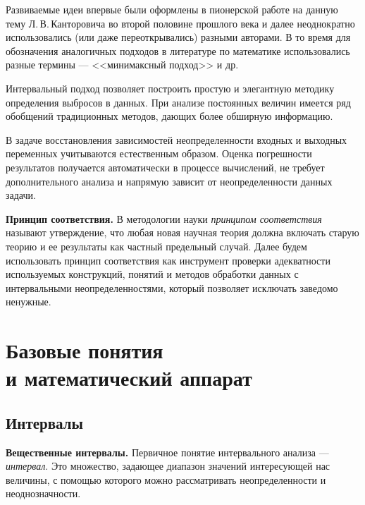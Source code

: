 \documentclass[a5paper,openany]{book}
\begin{document}
{{Развиваемые идеи впервые были оформлены в пионерской работе на данную тему
Л.\,В.\,Канторовича \cite{Kantorovich} во второй половине прошлого века и далее неоднократно использовались (или даже переоткрывались) разными авторами. 
В то время для обозначения  
аналогичных  подходов в литературе по математике использовались разные термины --- <<минимаксный подход>> и др. 

Интервальный подход позволяет построить простую и 
элегантную методику определения выбросов в данных. 
При анализе постоянных величин  имеется ряд обобщений традиционных методов, дающих более обширную информацию. 

В задаче восстановления зависимостей 
неопределенности входных и выходных переменных учитываются естественным образом. 
Оценка погрешности результатов получается автоматически в процессе вычислений, не требует дополнительного анализа и напрямую зависит от неопределенности 
данных задачи. 

{\bf Принцип соответствия.} 
В методологии науки \textit{принципом соответствия} называют утверждение, что любая 
новая научная теория должна включать старую теорию и ее результаты как частный 
предельный случай. 	Далее будем использовать принцип соответствия как инструмент проверки адекватности используемых конструкций, понятий и методов обработки данных с интервальными 
неопределенностями, который позволяет исключать заведомо ненужные.


	\chapter[Базовые понятия и математический аппарат]%
{Базовые понятия\\ и  математический аппарат} 
\label{PrimaryConceptChap} 



	\section{Интервалы} 
\label{IntervalSect} 


{\bf Вещественные интервалы.} 
Первичное понятие интервального анализа --- \emph{интервал}. Это множество, задающее диапазон значений интересующей нас величины, с помощью 
которого можно рассматривать неопределенности и неоднозначности. 

}}
\end{document}
